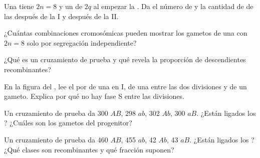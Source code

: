 \begin{exercise}[$\star$]\label{exo:g12:meiosis-genetic-shuffling:3}
Una  tiene $2n = 8$ y un  de $2q$ al empezar la . Da el
número de  y la cantidad de  de las  después de la
 I y después de la  II.
\end{exercise}

\begin{exercise}[$\star$]\label{exo:g12:meiosis-genetic-shuffling:4}
¿Cuántas combinaciones cromosómicas pueden mostrar los gametos de una
 con $2n = 8$ solo por segregación independiente?
\end{exercise}

\begin{exercise}[$\star$]\label{exo:g12:meiosis-genetic-shuffling:5}
¿Qué es un cruzamiento de prueba y qué revela la proporción de
descendientes recombinantes?
\end{exercise}

\begin{exercise}[$\star\star$]\label{exo:g12:meiosis-genetic-shuffling:6}
En la figura del , lee el  por  de una  en  I,
de una  entre las dos divisiones y de un gameto. Explica por qué
no hay fase S entre las divisiones.
\end{exercise}

\begin{exercise}[$\star\star$]\label{exo:g12:meiosis-genetic-shuffling:7}
Un cruzamiento de prueba da 300 $AB$, 298 $ab$, 302 $Ab$, 300 $aB$.
¿Están ligados los ? ¿Cuáles son los gametos del progenitor?
\end{exercise}

\begin{exercise}[$\star\star$]\label{exo:g12:meiosis-genetic-shuffling:8}
Un cruzamiento de prueba da 460 $AB$, 455 $ab$, 42 $Ab$, 43 $aB$.
¿Están ligados los ? ¿Qué clases son recombinantes y qué fracción
suponen?
\end{exercise}

